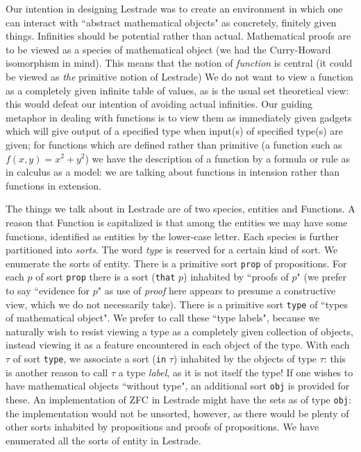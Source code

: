 \documentclass{article}
\begin{document}
 Our intention in designing Lestrade was to create an environment in which one can interact with ``abstract mathematical objects"  as concretely, finitely given things.  Infinities should be potential rather than actual.  Mathematical proofs are to be viewed as a species of mathematical object (we had the Curry-Howard isomorphism in mind).  This means that the notion of {\em function\/} is central (it could be viewed as {\em the\/} primitive notion of Lestrade)  We do not want to view a function as a completely given infinite table of values, as is the usual set theoretical view:  this would defeat our intention of avoiding actual infinities.  Our guiding metaphor in dealing with functions is to view them as immediately given gadgets which will give output of a specified type when input(s) of specified type(s) are given;  for functions which are defined rather than primitive (a function such as $f(x,y)=x^2+y^2$) we have the description of a function by a formula or rule as in calculus as a model:  we are talking about functions in intension rather than functions in extension.

The things we talk about in Lestrade are of two species, entities and Functions.  A reason that Function is capitalized is that among the entities we may have some functions, identified as entities by the lower-case letter.  Each species is further partitioned into {\em sorts\/}.  The word {\em type\/} is reserved for a certain kind of sort.  We enumerate the sorts of entity.  There is a primitive sort {\tt prop} of propositions.  For each $p$ of sort
{\tt prop} there is a sort ({\tt that} $p$) inhabited by ``proofs of $p$" (we prefer to say ``evidence for $p$" as use of {\em proof\/} here appears to presume a constructive view, which we do not necessarily take).  There is a primitive sort {\tt type\/} of ``types of mathematical object".  We prefer to call these ``type labels", because we naturally wish to resist viewing a type as a completely given collection of objects, instead viewing it as a feature encountered in each object of the type.  With each $\tau$ of sort {\tt type}, we associate a sort ({\tt in} $\tau$) inhabited by the objects of type $\tau$:  this is another reason to call $\tau$ a type {\em label\/}, as it is not itself the type!  If one wishes to have mathematical objects ``without type", an additional sort {\tt obj} is provided for these.  An implementation of ZFC in Lestrade might have the sets as of type {\tt obj}:  the implementation would not be unsorted, however, as there would be plenty of other sorts inhabited by propositions and proofs of propositions.  We have enumerated all the sorts of entity in Lestrade.
\end{document}
